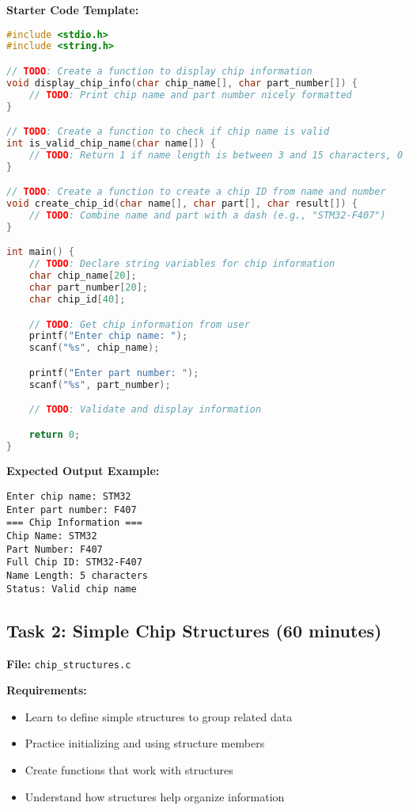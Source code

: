 \documentclass[11pt,a4paper]{article}
\begin{document}
\textbf{Starter Code Template:}
\begin{lstlisting}[language=C]
#include <stdio.h>
#include <string.h>

// TODO: Create a function to display chip information
void display_chip_info(char chip_name[], char part_number[]) {
    // TODO: Print chip name and part number nicely formatted
}

// TODO: Create a function to check if chip name is valid
int is_valid_chip_name(char name[]) {
    // TODO: Return 1 if name length is between 3 and 15 characters, 0 otherwise
}

// TODO: Create a function to create a chip ID from name and number
void create_chip_id(char name[], char part[], char result[]) {
    // TODO: Combine name and part with a dash (e.g., "STM32-F407")
}

int main() {
    // TODO: Declare string variables for chip information
    char chip_name[20];
    char part_number[20];
    char chip_id[40];

    // TODO: Get chip information from user
    printf("Enter chip name: ");
    scanf("%s", chip_name);

    printf("Enter part number: ");
    scanf("%s", part_number);

    // TODO: Validate and display information

    return 0;
}
\end{lstlisting}

\textbf{Expected Output Example:}
\begin{verbatim}
Enter chip name: STM32
Enter part number: F407
=== Chip Information ===
Chip Name: STM32
Part Number: F407
Full Chip ID: STM32-F407
Name Length: 5 characters
Status: Valid chip name
\end{verbatim}

\subsection{Task 2: Simple Chip Structures (60 minutes)}

\textbf{File:} \texttt{chip\_structures.c}

\textbf{Requirements:}
\begin{itemize}
    \item Learn to define simple structures to group related data
    \item Practice initializing and using structure members
    \item Create functions that work with structures
    \item Understand how structures help organize information
\end{itemize}
\end{document}
